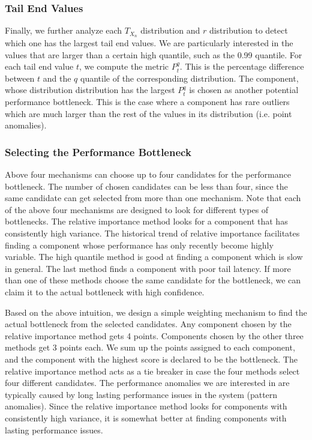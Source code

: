 \subsubsection{Tail End Values}
Finally, we further analyze each $T_{X_n}$ distribution and $r$ distribution to detect which one has the largest tail end values.
We are particularly interested in the values that are larger than a certain high quantile, such as the 0.99 quantile.
For each tail end value $t$, we compute the metric $P^q_t$. This is the percentage difference between $t$ and the
$q$ quantile of the corresponding distribution. The component, whose distribution distribution has
the largest $P^q_t$ is chosen as another potential performance bottleneck.
This is the case where a component has rare outliers which are much larger than the rest of 
the values in its distribution (i.e. point anomalies).

\subsubsection{Selecting the Performance Bottleneck}
Above four mechanisms can choose up to four candidates for the performance bottleneck. The number of
chosen candidates can be less than four, since the same candidate can get selected from more than
one mechanism. Note that each of the above four mechanisms are designed to look for different
types of bottlenecks. The relative importance method looks for a component that has consistently
high variance. The historical trend of relative importance facilitates finding a component whose
performance has only recently become highly variable. The high quantile method is good at
finding a component which is slow in general. The last method finds a component with poor
tail latency. If more than one of these methods choose the same candidate for the bottleneck,
we can claim it to the actual bottleneck with high confidence.

Based on the above intuition, we design a simple weighting mechanism to find the actual
bottleneck from the selected candidates. Any component chosen by the relative importance
method gets 4 points. Components chosen by the other three methods get 3 points each. 
We sum up the points assigned to each component, and the component with the highest
score is declared to be the bottleneck. The relative importance method acts as a tie breaker
in case the four methods select four different candidates. The performance anomalies we
are interested in are typically caused by long lasting performance issues in the system 
(pattern anomalies). Since the relative importance method looks for components with
consistently high variance, it is somewhat better at finding components
with lasting performance issues.
